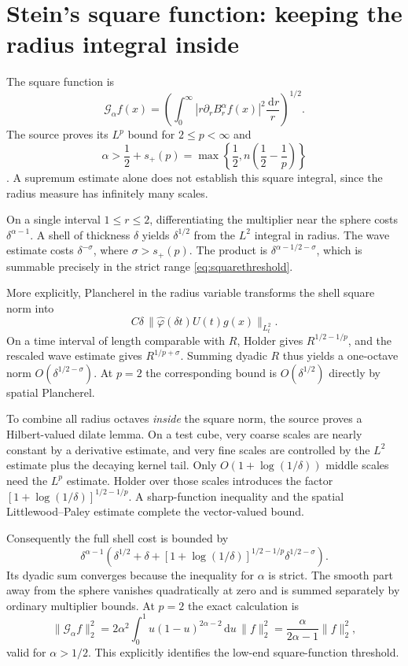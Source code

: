 \documentclass[11pt,a4paper]{article}
\numberwithin{equation}{section}
\theoremstyle{definition}
\theoremstyle{remark}
\newcommand{\dd}{\,\mathrm d}
\begin{document}
\section{Stein's square function: keeping the radius integral inside}
\label{sec:square}
The square function is
\[
 \mathcal G_\alpha f(x)=
 \left(\int_0^\infty|r\partial_rB_r^\alpha f(x)|^2\frac{\dd r}{r}\right)^{1/2}.
\]
The source proves its $L^p$ bound for $2\le p<\infty$ and
\begin{equation}\label{eq:squarethreshold}
 \alpha>\frac12+s_+(p)
     =\max\left\{\frac12,n\left(\frac12-\frac1p\right)\right\}
\end{equation}
\cite{stein}. A supremum estimate alone does not establish this square
integral, since the radius measure has infinitely many scales.

On a single interval $1\le r\le2$, differentiating the multiplier near the
sphere costs $\delta^{\alpha-1}$. A shell of thickness $\delta$ yields
$\delta^{1/2}$ from the $L^2$ integral in radius. The wave estimate costs
$\delta^{-\sigma}$, where $\sigma>s_+(p)$. The product is
$\delta^{\alpha-1/2-\sigma}$, which is summable precisely in the strict range
\eqref{eq:squarethreshold}.

More explicitly, Plancherel in the radius variable transforms the shell
square norm into
\[
 C\delta\,
 \|\widehat\varphi(\delta t)U(t)g(x)\|_{L^2_t}.
\]
On a time interval of length comparable with $R$, Holder gives
$R^{1/2-1/p}$, and the rescaled wave estimate gives
$R^{1/p+\sigma}$. Summing dyadic $R$ thus yields a one-octave norm
$O(\delta^{1/2-\sigma})$. At $p=2$ the corresponding bound is
$O(\delta^{1/2})$ directly by spatial Plancherel.

To combine all radius octaves \emph{inside} the square norm, the source proves
a Hilbert-valued dilate lemma. On a test cube, very coarse scales are nearly
constant by a derivative estimate, and very fine scales are controlled by the
$L^2$ estimate plus the decaying kernel tail. Only
$O(1+\log(1/\delta))$ middle scales need the $L^p$ estimate. Holder over
those scales introduces the factor
$[1+\log(1/\delta)]^{1/2-1/p}$. A sharp-function inequality and the spatial
Littlewood--Paley estimate complete the vector-valued bound.

Consequently the full shell cost is bounded by
\[
 \delta^{\alpha-1}
 \left(\delta^{1/2}+\delta+
 [1+\log(1/\delta)]^{1/2-1/p}\delta^{1/2-\sigma}\right).
\]
Its dyadic sum converges because the inequality for $\alpha$ is strict.
The smooth part away from the sphere vanishes quadratically at zero and is
summed separately by ordinary multiplier bounds. At $p=2$ the exact calculation
is
\[
 \|\mathcal G_\alpha f\|_2^2
 =2\alpha^2\int_0^1u(1-u)^{2\alpha-2}\dd u\,\|f\|_2^2
 =\frac{\alpha}{2\alpha-1}\|f\|_2^2,
\]
valid for $\alpha>1/2$. This explicitly identifies the low-end square-function
threshold.
\end{document}
